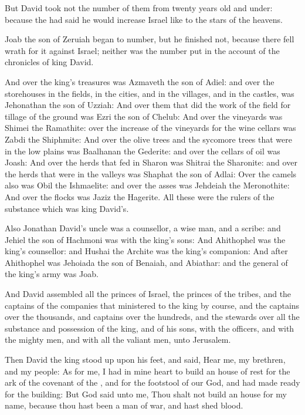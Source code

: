 \Verse But David took not the number of them from twenty years old and under: because the \LORD had said he would increase Israel like to the stars of the heavens.

\Verse Joab the son of Zeruiah began to number, but he finished not, because there fell wrath for it against Israel; neither was the number put in the account of the chronicles of king David.

\Verse And over the king's treasures was Azmaveth the son of Adiel: and over the storehouses in the fields, in the cities, and in the villages, and in the castles, was Jehonathan the son of Uzziah: \Verse And over them that did the work of the field for tillage of the ground was Ezri the son of Chelub: \Verse And over the vineyards was Shimei the Ramathite: over the increase of the vineyards for the wine cellars was Zabdi the Shiphmite: \Verse And over the olive trees and the sycomore trees that were in the low plains was Baalhanan the Gederite: and over the cellars of oil was Joash: \Verse And over the herds that fed in Sharon was Shitrai the Sharonite: and over the herds that were in the valleys was Shaphat the son of Adlai: \Verse Over the camels also was Obil the Ishmaelite: and over the asses was Jehdeiah the Meronothite: \Verse And over the flocks was Jaziz the Hagerite. All these were the rulers of the substance which was king David's.

\Verse Also Jonathan David's uncle was a counsellor, a wise man, and a scribe: and Jehiel the son of Hachmoni was with the king's sons: \Verse And Ahithophel was the king's counsellor: and Hushai the Archite was the king's companion: \Verse And after Ahithophel was Jehoiada the son of Benaiah, and Abiathar: and the general of the king's army was Joab.


\Chapter
\Verse And David assembled all the princes of Israel, the princes of the tribes, and the captains of the companies that ministered to the king by course, and the captains over the thousands, and captains over the hundreds, and the stewards over all the substance and possession of the king, and of his sons, with the officers, and with the mighty men, and with all the valiant men, unto Jerusalem.

\Verse Then David the king stood up upon his feet, and said, Hear me, my brethren, and my people: As for me, I had in mine heart to build an house of rest for the ark of the covenant of the \LORD, and for the footstool of our God, and had made ready for the building: \Verse But God said unto me, Thou shalt not build an house for my name, because thou hast been a man of war, and hast shed blood.

